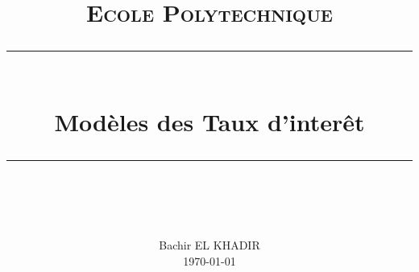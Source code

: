 
\usepackage{fancyhdr}
\pagestyle{fancyplain}
\fancyhead{}											%
\fancyfoot[L]{}											%
\fancyfoot[C]{}											%
\fancyfoot[R]{\thepage}									%
\renewcommand{\headrulewidth}{0pt}			%
\renewcommand{\footrulewidth}{0pt}				%
\setlength{\headheight}{13.6pt}




\newcommand{\horrule}[1]{\rule{\linewidth}{#1}} 	%
\newcommand{\espr}[1]{
  \mathrm{E}^Q \left[ #1 \right]
}

\newcommand{\Qespr}[2]{
  \mathrm{E}^{#1} \left[ #2 \right]
}

\title{
		\normalfont \normalsize \textsc{Ecole Polytechnique} \\ [25pt]
		\horrule{0.5pt} \\[0.4cm]
		\huge Modèles des Taux d'interêt \\
		\horrule{2pt} \\[0.5cm]
}
\author{
		\normalfont \normalsize
                Bachir EL KHADIR\\[-3pt] \normalsize
                \today	
}
\date{}

\theoremstyle{definition}
\newtheorem{theorem}{Theorem}
\newtheorem{defn}{Definition}

\newcommand{\IMG}[3]{
  \begin{figure}[h!]
    \centering
    \texttt{[image: \#1]}%
    \caption{#2}
    \label{#1}
  \end{figure}
}









